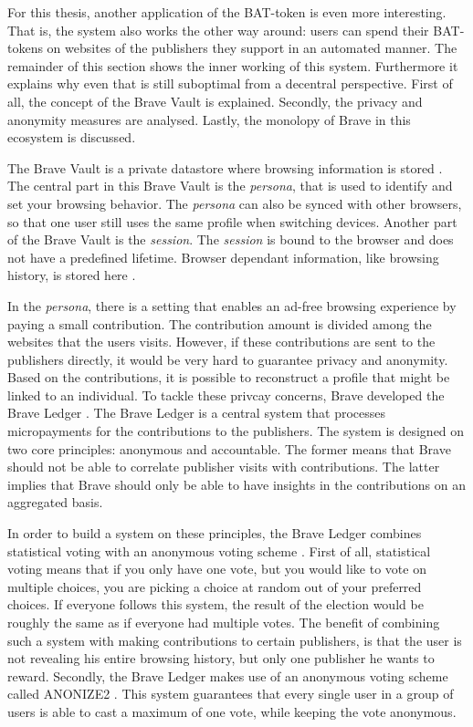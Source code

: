 For this thesis, another application of the BAT-token is even more interesting. That is, the system also works the other way around: users can spend their BAT-tokens on websites of the publishers they support in an automated manner. The remainder of this section shows the inner working of this system. Furthermore it explains why even that is still suboptimal from a decentral perspective. First of all, the concept of the Brave Vault is explained. Secondly, the privacy and anonymity measures are analysed. Lastly, the monolopy of Brave in this ecosystem is discussed.

The Brave Vault is a private datastore where browsing information is stored \cite{brave-vault}. The central part in this Brave Vault is the \textit{persona}, that is used to identify and set your browsing behavior. The \textit{persona} can also be synced with other browsers, so that one user still uses the same profile when switching devices. Another part of the Brave Vault is the \textit{session}. The \textit{session} is bound to the browser and does not have a predefined lifetime. Browser dependant information, like browsing history, is stored here \cite{brave-vault}.

In the \textit{persona}, there is a setting that enables an ad-free browsing experience by paying a small contribution. The contribution amount is divided among the websites that the users visits. However, if these contributions are sent to the publishers directly, it would be very hard to guarantee privacy and anonymity. Based on the contributions, it is possible to reconstruct a profile that might be linked to an individual. To tackle these privcay concerns, Brave developed the Brave Ledger \cite{bat-ledger}. The Brave Ledger is a central system that processes micropayments for the contributions to the publishers. The system is designed on two core principles: anonymous and accountable. The former means that Brave should not be able to correlate publisher visits with contributions. The latter implies that Brave should only be able to have insights in the contributions on an aggregated basis.

In order to build a system on these principles, the Brave Ledger combines statistical voting with an anonymous voting scheme \cite{bat-ledger}. First of all, statistical voting means that if you only have one vote, but you would like to vote on multiple choices, you are picking a choice at random out of your preferred choices. If everyone follows this system, the result of the election would be roughly the same as if everyone had multiple votes. The benefit of combining such a system with making contributions to certain publishers, is that the user is not revealing his entire browsing history, but only one publisher he wants to reward. Secondly, the Brave Ledger makes use of an anonymous voting scheme called ANONIZE2 \cite{hohenberger2014anonize}. This system guarantees that every single user in a group of users is able to cast a maximum of one vote, while keeping the vote anonymous.


